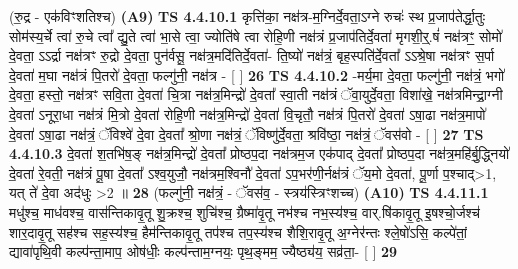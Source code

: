 \documentclass[17pt]{extarticle}
\begin{document}
                  \newline
                      (रु॒द्र - एक॑विꣳशतिश्च)  \textbf{(A9)} \newline \newline
                                        \textbf{ TS 4.4.10.1} \newline
                  कृत्ति॑का॒ नक्ष॑त्र-म॒ग्निर्दे॒वता॒ऽग्ने रुचः॑ स्थ प्र॒जाप॑तेर्द्धा॒तुः सोम॑स्य॒र्चे त्वा॑ रु॒चे त्वा᳚ द्यु॒ते त्वा॑ भा॒से त्वा॒ ज्योति॑षे त्वा रोहि॒णी नक्ष॑त्रं प्र॒जाप॑तिर्दे॒वता॑ मृगशी॒र्॒.षं॑ नक्ष॑त्रꣳ॒॒ सोमो॑ दे॒वता॒ ऽऽर्द्रा नक्ष॑त्रꣳ रु॒द्रो दे॒वता॒ पुन॑र्वसू॒ नक्ष॑त्र॒मदि॑तिर्दे॒वता॑- ति॒ष्यो॑ नक्ष॑त्रं॒ बृह॒स्पति॑र्दे॒वता᳚ ऽऽश्रे॒षा नक्ष॑त्रꣳ स॒र्पा दे॒वता॑ म॒घा नक्ष॑त्रं पि॒तरो॑ दे॒वता॒ फल्गु॑नी॒ नक्ष॑त्र - [  ] \textbf{  26} \newline
                  \newline
                                \textbf{ TS 4.4.10.2} \newline
                  -मर्य॒मा दे॒वता॒ फल्गु॑नी॒ नक्ष॑त्रं॒ भगो॑ दे॒वता॒ हस्तो॒ नक्ष॑त्रꣳ सवि॒ता दे॒वता॑ चि॒त्रा नक्ष॑त्र॒मिन्द्रो॑ दे॒वता᳚ स्वा॒ती नक्ष॑त्रं ॅवा॒युर्दे॒वता॒ विशा॑खे॒ नक्ष॑त्रमिन्द्रा॒ग्नी दे॒वता॑ ऽनूरा॒धा नक्ष॑त्रं मि॒त्रो दे॒वता॑ रोहि॒णी नक्ष॑त्र॒मिन्द्रो॑ दे॒वता॑ वि॒चृतौ॒ नक्ष॑त्रं पि॒तरो॑ दे॒वता॑ ऽषा॒ढा नक्ष॑त्र॒मापो॑ दे॒वता॑ ऽषा॒ढा नक्ष॑त्रं॒ ॅविश्वे॑ दे॒वा दे॒वता᳚ श्रो॒णा नक्ष॑त्रं॒ ॅविष्णु॑र्दे॒वता॒ श्रवि॑ष्ठा॒ नक्ष॑त्रं॒ ॅवस॑वो - [  ] \textbf{  27} \newline
                  \newline
                                \textbf{ TS 4.4.10.3} \newline
                  दे॒वता॑ श॒तभि॑ष॒ङ् नक्ष॑त्र॒मिन्द्रो॑ दे॒वता᳚ प्रोष्ठप॒दा नक्ष॑त्रम॒ज एक॑पाद् दे॒वता᳚ प्रोष्ठप॒दा नक्ष॑त्र॒महि॑र्बु॒द्ध्नियो॑ दे॒वता॑ रे॒वती॒ नक्ष॑त्रं पू॒षा दे॒वता᳚ ऽश्व॒युजौ॒ नक्ष॑त्रम॒श्विनौ॑ दे॒वता॑ ऽप॒भर॑णी॒र्नक्ष॑त्रं ॅय॒मो दे॒वता॑, पू॒र्णा प॒श्चाद्>1, यत् ते॑ दे॒वा अद॑धुः >2 ॥ \textbf{  28} \newline
                  \newline
                      (फल्गु॑नी॒ नक्ष॑त्रं॒ - ॅवस॑व॒ - स्त्रय॑स्त्रिꣳशच्च)  \textbf{(A10)} \newline \newline
                                        \textbf{ TS 4.4.11.1} \newline
                  मधु॑श्च॒ माध॑वश्च॒ वास॑न्तिकावृ॒तू शु॒क्रश्च॒ शुचि॑श्च॒ ग्रैष्मा॑वृ॒तू नभ॑श्च नभ॒स्य॑श्च॒ वार्.षि॑कावृ॒तू इ॒षश्चो॒र्जश्च॑ शार॒दावृ॒तू सह॑श्च सह॒स्य॑श्च॒ हैम॑न्तिकावृ॒तू तप॑श्च तप॒स्य॑श्च शैशि॒रावृ॒तू अ॒ग्नेर॑न्तः श्ले॒षो॑ऽसि॒ कल्पे॑तां॒ द्यावा॑पृथि॒वी कल्प॑न्ता॒माप॒ ओष॑धीः॒ कल्प॑न्ताम॒ग्नयः॒ पृथ॒ङ्मम॒ ज्यैष्ठ्य॑य॒ सव्र॑ता॒- [  ] \textbf{  29} \newline
\end{document}
